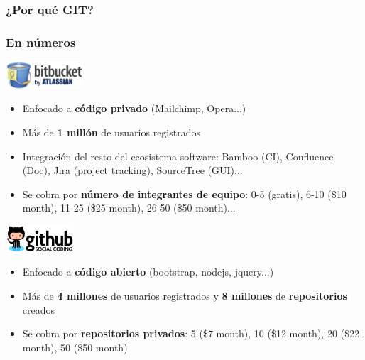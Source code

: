 \frame
{
\frametitle{¿Por qué GIT?}
}
\usebackgroundtemplate{}
\frame
{
\frametitle{En números}
\includegraphics[height=1cm]{imgs/git-bitbucket.png}
\begin{itemize}
 \item Enfocado a \textbf{código privado} (Mailchimp, Opera...)
 \item Más de \textbf{1 millón} de usuarios registrados
 \item Integración del resto del ecosistema software: Bamboo (CI), Confluence (Doc), Jira (project tracking), SourceTree (GUI)...
 \item Se cobra por \textbf{número de integrantes de equipo}: 0-5 (gratis), 6-10 (\$10 month), 11-25 (\$25 month), 26-50 (\$50 month)...
\end{itemize}

\includegraphics[height=1cm]{imgs/git-github.png}
\begin{itemize}
 \item Enfocado a \textbf{código abierto} (bootstrap, nodejs, jquery...)
 \item Más de \textbf{4 millones} de usuarios registrados y \textbf{8 millones} de \textbf{repositorios} creados
 \item Se cobra por \textbf{repositorios privados}: 5 (\$7 month), 10 (\$12 month), 20 (\$22 month), 50 (\$50 month)
\end{itemize}
}
